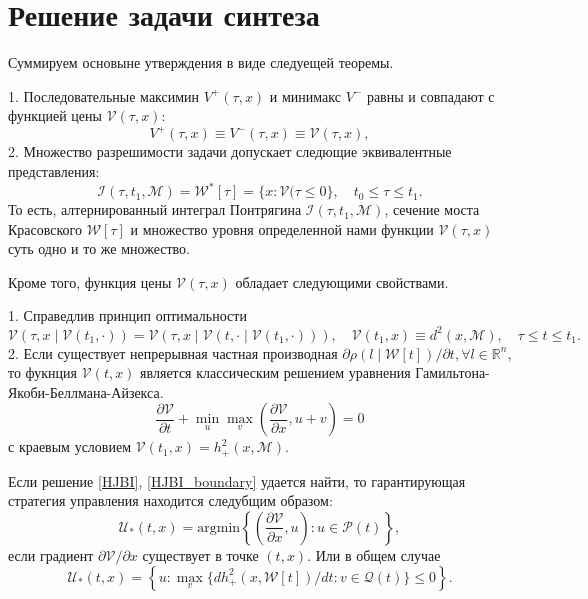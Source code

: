 \section{Решение задачи синтеза}
Суммируем основыне утверждения в виде следуещей теоремы.
\begin{theorem}
    1. Последовательные максимин \( V^+(\tau, x) \) и минимакс \( V^-\) равны и совпадают с функцией
     цены \( \mathcal{V}(\tau,x) \):
    \[
        V^+(\tau, x) \equiv V^-(\tau, x) \equiv \mathcal{V}(\tau, x),
    \]
    2. Множество разрешимости задачи допускает следющие эквивалентные представления:
    \[
        \mathcal{I}(\tau, t_1, \mathcal{M}) = \mathcal{W}^*[\tau] = \{ x : \mathcal{V}(\tau \le 0 \},
         \quad t_0 \le \tau \le t_1.
    \]
    То есть, алтернированный интеграл Понтрягина \( \mathcal{I}(\tau, t_1, \mathcal{M}) \), сечение
     моста Красовского \( \mathcal{W}[\tau] \) и множество уровня определенной нами функции
     \( \mathcal{V}(\tau, x) \) суть одно и то же множество. 
\end{theorem}

Кроме того, функция цены \( \mathcal{V}(\tau, x) \) обладает следующими свойствами.
\begin{theorem}
    1. Справедлив принцип оптимальности
    \[
        \mathcal{V}(\tau, x \mid \mathcal{V}(t_1, \cdot)) = \mathcal{V}(\tau, x \mid \mathcal{V}(t, 
         \cdot \mid \mathcal{V}(t_1, \cdot))), \quad \mathcal{V}(t_1, x) \equiv d^2(x, \mathcal{M}),
         \quad \tau \le t \le t_1. 
    \]
    2. Если существует непрерывная частная производная \( \partial \rho(l \mid \mathcal{W}[t]) / 
     \partial t, \forall l \in \mathbb{R}^n \), то фукнция \( \mathcal{V}(t, x) \) является 
     классическим решением уравнения Гамильтона-Якоби-Беллмана-Айзекса.
    \[
        \frac{\partial \mathcal{V}}{\partial t} + \min_u \max_v \left( \frac{\partial \mathcal{V}}
         {\partial x}, u + v \right) = 0
    \]
    с краевым условием \( \mathcal{V}(t_1, x) = h_+^2(x, \mathcal{M}) \).
\end{theorem}

Если решение \eqref{HJBI}, \eqref{HJBI_boundary} удается найти, то гарантирующая стратегия управления
 находится следубщим образом:
\begin{equation}
    \mathcal{U}_*(t,x) = \mathrm{argmin} \left\{ \left( \frac{\partial \mathcal{V}}{\partial x},
     u \right) : u \in \mathcal{P}(t) \right\},
\end{equation}
если градиент \( \partial \mathcal{V} / \partial x \) существует в точке \( (t, x) \). Или в общем
 случае
\begin{equation}
    \mathcal{U}_*(t,x) = \left\{ u: \max_v \{ dh_+^2(x, \mathcal{W}[t]) / dt : v \in \mathcal{Q}(t) \} 
     \le 0 \right\}.
\end{equation}

